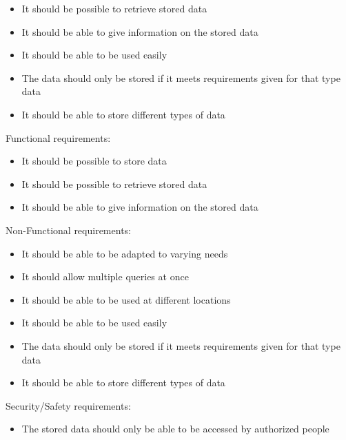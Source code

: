 \begin{elenco}
\begin{itemize}
    \item It should be possible to retrieve stored data
    \item It should be able to give information on the stored data
    \item It should be able to be used easily
    \item The data should only be stored if it meets requirements given for that type data
    \item It should be able to store different types of data
\end{itemize}
\item
Functional requirements:
\begin{itemize}
    \item It should be possible to store data
    \item It should be possible to retrieve stored data
    \item It should be able to give information on the stored data
\end{itemize} 
Non-Functional requirements:
\begin{itemize}
    \item It should be able to be adapted to varying needs
    \item It should allow multiple queries at once
    \item It should be able to be used at different locations
    \item It should be able to be used easily
    \item The data should only be stored if it meets requirements given for that type data
    \item It should be able to store different types of data
\end{itemize} 
Security/Safety requirements:
\begin{itemize}
    \item The stored data should only be able to be accessed by authorized people
\end{itemize} 
\end{elenco}